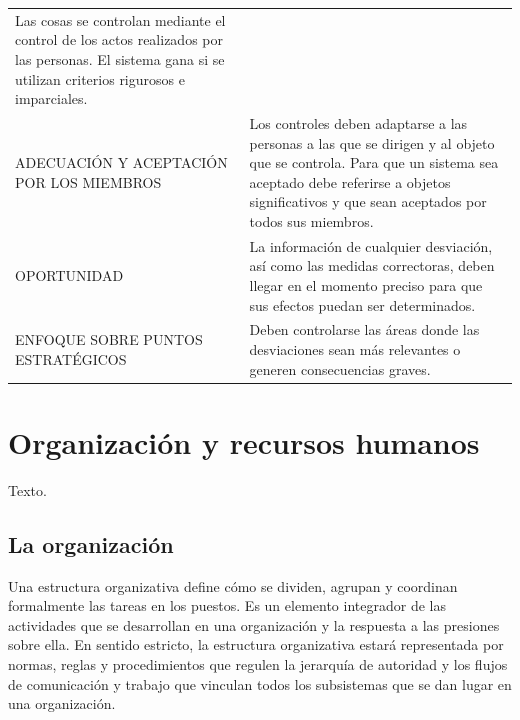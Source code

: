 \documentclass[
]{krantz}
\begin{document}
\begin{longtable}[]{@{}ll@{}}
\begin{minipage}[t]{0.39\columnwidth}
Las cosas se controlan mediante el control de los actos realizados por las personas. El sistema gana si se utilizan criterios rigurosos e imparciales.\strut
\end{minipage}\tabularnewline
\begin{minipage}[t]{0.55\columnwidth}\raggedright
ADECUACIÓN Y ACEPTACIÓN POR LOS MIEMBROS\strut
\end{minipage} & \begin{minipage}[t]{0.39\columnwidth}\raggedright
Los controles deben adaptarse a las personas a las que se dirigen y al objeto que se controla. Para que un sistema sea aceptado debe referirse a objetos significativos y que sean aceptados por todos sus miembros.\strut
\end{minipage}\tabularnewline
\begin{minipage}[t]{0.55\columnwidth}\raggedright
OPORTUNIDAD\strut
\end{minipage} & \begin{minipage}[t]{0.39\columnwidth}\raggedright
La información de cualquier desviación, así como las medidas correctoras, deben llegar en el momento preciso para que sus efectos puedan ser determinados.\strut
\end{minipage}\tabularnewline
\begin{minipage}[t]{0.55\columnwidth}\raggedright
ENFOQUE SOBRE PUNTOS ESTRATÉGICOS\strut
\end{minipage} & \begin{minipage}[t]{0.39\columnwidth}\raggedright
Deben controlarse las áreas donde las desviaciones sean más relevantes o generen consecuencias graves.\strut
\end{minipage}\tabularnewline
\bottomrule
\end{longtable}

\hypertarget{organizaciuxf3n-y-recursos-humanos}{%
\chapter{Organización y recursos humanos}\label{organizaciuxf3n-y-recursos-humanos}}

Texto.

\hypertarget{la-organizaciuxf3n}{%
\section{La organización}\label{la-organizaciuxf3n}}

Una estructura organizativa define cómo se dividen, agrupan y coordinan formalmente las tareas en los puestos. Es un elemento integrador de las actividades que se desarrollan en una organización y la respuesta a las presiones sobre ella. En sentido estricto, la estructura organizativa estará representada por normas, reglas y procedimientos que regulen la jerarquía de autoridad y los flujos de comunicación y trabajo que vinculan todos los subsistemas que se dan lugar en una organización.
\end{document}
